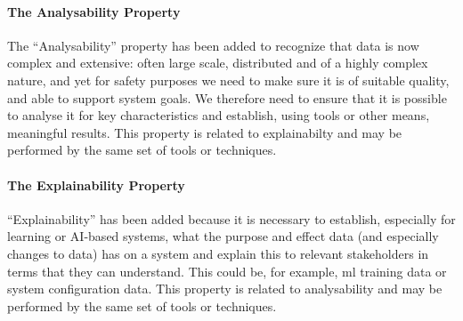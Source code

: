 \paragraph{The Analysability Property}\label{bkm:guidance:analysability}
The ``Analysability'' property has been added to recognize that data is now complex and extensive: often large scale, distributed and of a highly complex nature, and yet for safety purposes we need to make sure it is of suitable quality, and able to support system goals.
We therefore need to ensure that it is possible to analyse it for key characteristics and establish, using tools or other means, meaningful results. This property is related to explainabilty and may be performed by the same set of tools or techniques.

\paragraph{The Explainability Property}\label{bkm:guidance:explainability}
``Explainability'' has been added because it is necessary to establish, especially for learning or AI-based systems,
what the purpose and effect data (and especially changes to data) has on a system
and explain this to relevant stakeholders in terms that they can understand.
This could be, for example, \gls{ml} training data or system configuration data.
This property is related to analysability and may be performed by the same set of tools or techniques.
%
\clearpage
